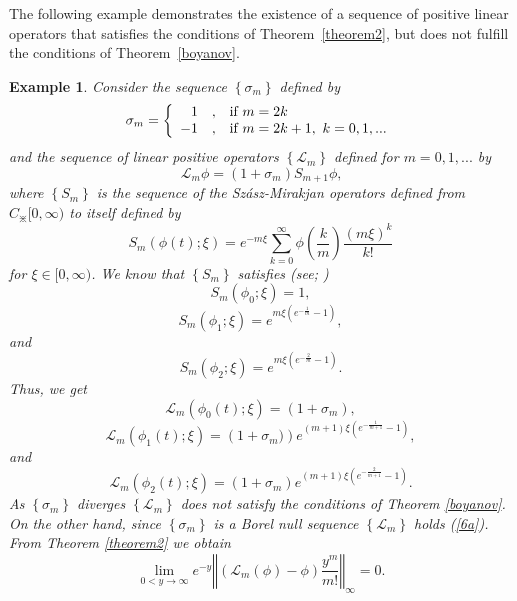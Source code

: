\documentclass{amsart}
\theoremstyle{plain}
\newtheorem{example}{Example}
\numberwithin{equation}{section}
\begin{document}
The following example demonstrates the existence of a sequence of positive linear 
operators that satisfies the conditions of Theorem~\ref{theorem2}, 
but does not fulfill the conditions of Theorem~\ref{boyanov}.


\begin{example}
Consider the sequence $\left \{  \sigma_{m}\right \}  $ defined by%
\[
\sigma_{m}=\left \{
\begin{array}
[c]{rll}%
1 & , & \text{if }m=2k\\
-1 & , & \text{if }m=2k+1,\text{ }k=0,1,...
\end{array}
\right.
\]
and the sequence of linear positive operators $\left \{  \mathcal{L}%
_{m}\right \}  $ defined for $m=0,1,...$ by
\[%
\mathcal{L}%
_{m}\phi=(1+\sigma_{m})S_{m+1}\phi \text{,}%
\]
where $\left \{  S_{m}\right \}  $ is the sequence of the Sz\'{a}sz-Mirakjan
operators defined from $C_{\divideontimes}[0,\infty)$ to itself defined by%
\begin{equation}
S_{m}(\phi(t);\xi)=e^{-m\xi}\sum \limits_{k=0}^{\infty}\phi \left(  \frac{k}%
{m}\right)  \frac{(m\xi)^{k}}{k!}\label{szasz}%
\end{equation}
for $\xi \in \lbrack0,\infty)$. We know that $\left \{  S_{m}\right \}  $ satisfies (see;
\cite{holhos2018})%
\begin{equation}
S_{m}(\phi_{0};\xi)=1,\label{SZASZ1}%
\end{equation}%
\begin{equation}
S_{m}(\phi_{1};\xi)=e^{m\xi(e^{-\frac{1}{m}}-1)},\label{szasz-2}%
\end{equation}
and%
\begin{equation}
S_{m}(\phi_{2};\xi)=e^{m\xi(e^{-\frac{2}{m}}-1)}.\label{szasz-3}%
\end{equation}
Thus, we get%
\[%
\mathcal{L}%
_{m}(\phi_{0}\left(  t\right)  ;\xi)=(1+\sigma_{m}),
\]%
\[%
\mathcal{L}%
_{m}(\phi_{1}\left(  t\right)  ;\xi)=\left(  1+\sigma_{m})\right)  e^{\left(
m+1\right)  \xi(e^{-\frac{1}{m+1}}-1)},
\]
and%
\[%
\mathcal{L}%
_{m}(\phi_{2}\left(  t\right)  ;\xi)=\left(  1+\sigma_{m}\right)  e^{\left(
m+1\right)  \xi(e^{-\frac{2}{m+1}}-1)}\text{.}%
\]
As $\left \{  \sigma_{m}\right \}  $ diverges $\left \{  \mathcal{L}_{m}\right \}
$ does not satisfy the conditions of Theorem \ref{boyanov}. On the other hand,
since $\left \{  \sigma_{m}\right \}  $ is a Borel null sequence $\left \{
\mathcal{L}%
_{m}\right \}  $ holds (\ref{6a}). From Theorem \ref{theorem2} we obtain%
\[
\lim_{0<y\rightarrow \infty}e^{-y}\left \Vert \left(
\mathcal{L}%
_{m}(\phi)-\phi \right)  \frac{y^{m}}{m!}\right \Vert _{\infty}=0.
\]

\end{example}
\end{document}
